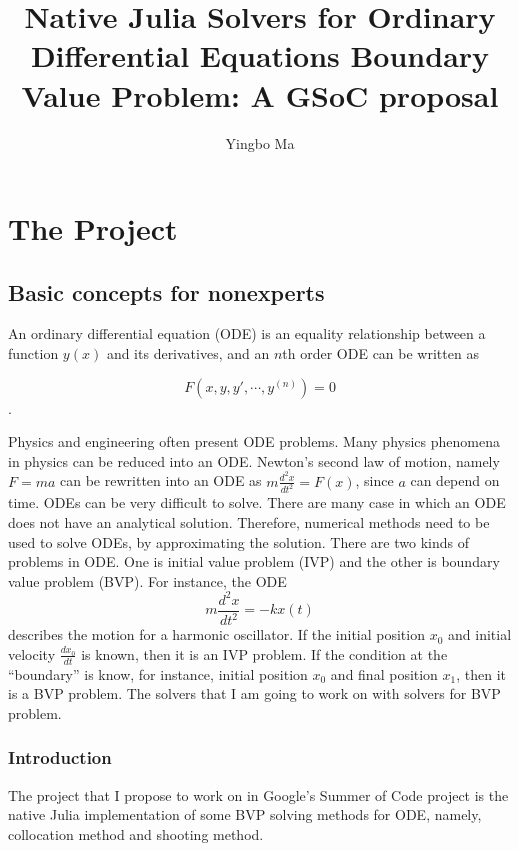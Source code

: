 \documentclass[a4paper,12pt,onecolumn]{article}
\author{Yingbo Ma}
\title{Native Julia Solvers for Ordinary Differential Equations Boundary Value Problem: A GSoC proposal}
\begin{document}
\maketitle
\maketitle
\tableofcontents



\section{The Project} %
\label{sec:the_project}

\subsection{Basic concepts for nonexperts} %
\label{sub:basic_concepts_for_nonexperts}
An ordinary differential equation (ODE)  is an equality relationship between a function $y(x)$
and its derivatives, and an $n$th order ODE can be written as

\[F(x, y, y', \cdots, y^{(n)}) = 0\].

Physics and engineering often present ODE problems. Many physics phenomena in physics can be reduced into an ODE. Newton's second law of motion, namely $F=ma$ can be rewritten into an ODE as $m\frac{d^2x}{dt^2}
=F(x)$, since $a$ can depend on time. ODEs can be very difficult to solve. There are many case in which an ODE does not have an analytical solution. Therefore, numerical methods need to be used to solve
ODEs, by approximating the solution. There are two kinds of problems in ODE. One is initial
value problem (IVP) and the other is boundary value problem (BVP). For instance, the ODE
\[m\frac{d^2x}{dt^2} = -kx(t)\]
describes the motion for a harmonic oscillator. If the initial position $x_0$ and initial velocity
$\frac{dx_0}{dt}$ is known, then it is an IVP problem. If the condition at the ``boundary'' is know,
for instance, initial position $x_0$ and final position $x_1$, then it is a BVP problem. The solvers
that I am going to work on with solvers for BVP problem.

\subsubsection{Introduction} %
\label{ssub:introduction}
The project that I propose to work on in Google's Summer of Code project is the native Julia
implementation of some BVP solving methods for ODE, namely, collocation method and shooting method.
\end{document}
